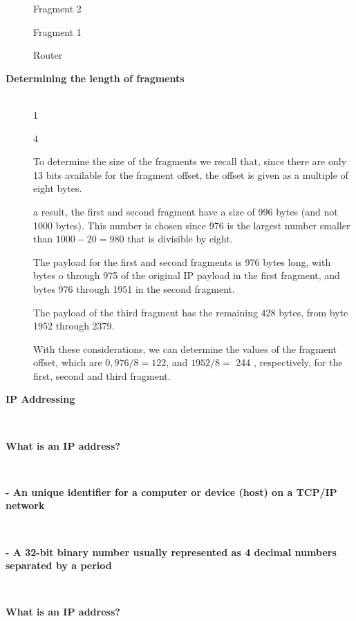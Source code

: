 \begin{description}
Fragment 2

Fragment 1

Router


\os{\newpage}\item[{\rot\bf  Determining the length of fragments }]~\\[-3ex]

1

4

\bi
  \ite To determine the size of the fragments we recall that, since there are only 13 bits available for the fragment offset, the offset is given as a multiple of eight bytes.

  \ite a result, the first and second fragment have a size of 996 bytes (and not 1000 bytes). This number is chosen since 976 is the largest number smaller than $1000-20=980$ that is divisible by eight.

  \ite The payload for the first and second fragments is 976 bytes long, with bytes o through 975 of the original IP payload in the first fragment, and bytes 976 through 1951 in the second fragment.

  \ite The payload of the third fragment has the remaining 428 bytes, from byte 1952 through 2379.

  \ite With these considerations, we can determine the values of the fragment offset, which are $0,976 / 8=122$, and $1952 / 8=$ 244 , respectively, for the first, second and third fragment.

\ei


\os{\newpage}\item[{\rot\bf  IP Addressing }]~\\[-3ex]


\item[{\rot\bf  What is an IP address?  }]~\\[-3ex]


\os{\newpage}\item[{\rot\bf  - An unique identifier for a computer or device (host) on a TCP/IP network }]~\\[-3ex]


\os{\newpage}\item[{\rot\bf  - A 32-bit binary number usually represented as 4 decimal numbers separated by a period }]~\\[-3ex]




\item[{\rot\bf  What is an IP address?  }]~\\[-3ex]



\end{description}
